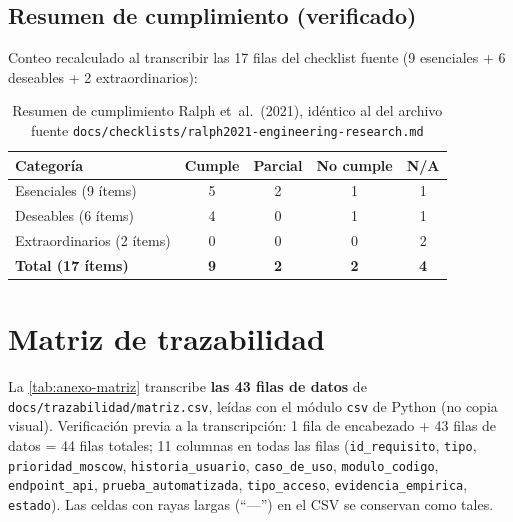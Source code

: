 \subsection{Resumen de cumplimiento (verificado)}

Conteo recalculado al transcribir las 17 filas del checklist fuente
(9 esenciales + 6 deseables + 2 extraordinarios):

\begin{table}[h]
\centering
\small
\begin{tabular}{lcccc}
\toprule
Categoría & Cumple & Parcial & No cumple & N/A \\
\midrule
Esenciales (9 ítems) & 5 & 2 & 1 & 1 \\
Deseables (6 ítems) & 4 & 0 & 1 & 1 \\
Extraordinarios (2 ítems) & 0 & 0 & 0 & 2 \\
\midrule
\textbf{Total (17 ítems)} & \textbf{9} & \textbf{2} & \textbf{2} & \textbf{4} \\
\bottomrule
\end{tabular}
\caption{Resumen de cumplimiento Ralph et~al.\ (2021), idéntico al del
  archivo fuente \texttt{docs/checklists/ralph2021-engineering-research.md}}
\label{tab:anexo-ralph-resumen}
\end{table}

\section{Matriz de trazabilidad}

La \autoref{tab:anexo-matriz} transcribe \textbf{las 43 filas de datos} de
\texttt{docs/trazabilidad/matriz.csv}, leídas con el módulo
\texttt{csv} de Python (no copia visual). Verificación previa a la
transcripción: 1 fila de encabezado + 43 filas de datos = 44 filas
totales; 11 columnas en todas las filas
(\texttt{id\_requisito}, \texttt{tipo}, \texttt{prioridad\_moscow},
\texttt{historia\_usuario}, \texttt{caso\_de\_uso},
\texttt{modulo\_codigo}, \texttt{endpoint\_api},
\texttt{prueba\_automatizada}, \texttt{tipo\_acceso},
\texttt{evidencia\_empirica}, \texttt{estado}). Las celdas con rayas
largas (``---'') en el CSV se conservan como tales.

